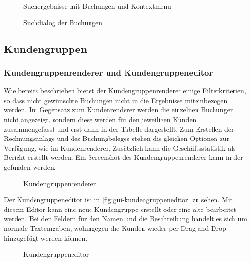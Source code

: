 \begin{figure}[htb]
	\centering
	\caption{Suchergebnisse mit Buchungen und Kontextmenu}
	\label{fig:suchergebnisse}
\end{figure}
\begin{figure}[htbp]
	\centering
	\caption{Suchdialog der Buchungen}
	\label{fig:gui-suchdialog}
\end{figure}

\subsection{Kundengruppen}

\subsubsection{Kundengruppenrenderer und Kundengruppeneditor}
Wie bereits beschrieben bietet der Kundengruppenrenderer einige Filterkriterien, so dass nicht gewünschte Buchungen nicht in die Ergebnisse miteinbezogen werden.
Im Gegensatz zum Kundenrenderer werden die einzelnen Buchungen nicht angezeigt, sondern diese werden für den jeweiligen Kunden zusammengefasst und erst dann in der Tabelle dargestellt.
Zum Erstellen der Rechnungsanlage und des Buchungbeleges stehen die gleichen Optionen zur Verfügung, wie im Kundenrenderer.
Zusätzlich kann die Geschäftsstatistik als Bericht erstellt werden.
Ein Screenshot des Kundengruppenrenderer kann in der  gefunden werden.
\begin{figure}[htb]
	\centering
	\caption{Kundengruppenrenderer}
	\label{fig:gui-kundengruppenrenderer}
\end{figure}

Der Kundengruppeneditor ist in \autoref{fig:gui-kundengruppeneditor} zu sehen. Mit diesem Editor kann eine neue Kundengruppe erstellt oder eine alte bearbeitet werden. Bei den Feldern für den Namen und die Beschreibung handelt es sich um normale Texteingaben, wohingegen die Kunden wieder per Drag-and-Drop hinzugefügt werden können.

\begin{figure}[htb]
	\centering
	\caption{Kundengruppeneditor}
	\label{fig:gui-kundengruppeneditor}
\end{figure}

